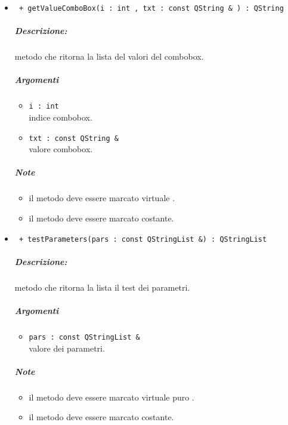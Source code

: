 \begin{itemize}
	\item \color{blue}\verb! + getValueComboBox(i : int , txt : const QString & ) : QString!
		\color{black}
		\subparagraph{Descrizione:} metodo che ritorna la lista del valori del combobox.
		\subparagraph{Argomenti}
			\begin{itemize}
				\item \color{RoyalPurple} \verb!i : int ! \\ 
				\color{black} indice combobox.
				\item \color{RoyalPurple} \verb!txt : const QString & ! \\ 
				\color{black} valore combobox.		
			\end{itemize}
		\subparagraph{Note}
			\begin{itemize}
				\item il metodo deve essere marcato virtuale .
				\item il metodo deve essere marcato costante.
			\end{itemize}				
			
		\item \color{blue}\verb! + testParameters(pars : const QStringList &) : QStringList!
		\color{black}
		\subparagraph{Descrizione:} metodo che ritorna la lista il test dei parametri.
		\subparagraph{Argomenti}
			\begin{itemize}
				\item \color{RoyalPurple} \verb!pars : const QStringList & ! \\ 
				\color{black} valore dei parametri.	
			\end{itemize}
		\subparagraph{Note}
			\begin{itemize}
				\item il metodo deve essere marcato virtuale puro .
				\item il metodo deve essere marcato costante.
			\end{itemize}				
			
	\end{itemize}
\pagebreak
\color{black}
